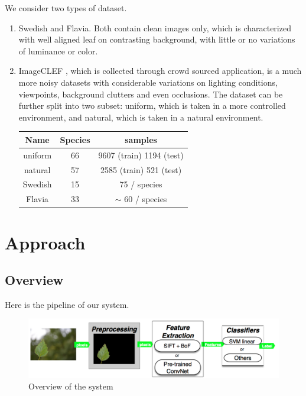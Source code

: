 \documentclass[journal, 10pt]{IEEEtran}
\begin{document}
    We consider two types of dataset.
\begin{enumerate}
  \item Swedish\cite{SwedishLeafDataset} and Flavia\cite{FlaviaDataset}. Both contain clean images only, which is characterized with well aligned leaf on contrasting background, with little or no variations of luminance or color. \\

  \item ImageCLEF \cite{ImageCLEF2013}, which is collected through crowd sourced application, is a much more noisy datasets with considerable variations on lighting conditions, viewpoints, background clutters and even occlusions. The dataset can be further split into two subset: uniform, which is taken in a more controlled environment, and natural, which is taken in a natural environment.
  \begin{center}
      \begin{tabular}{| c | c | c |}
      \hline
      Name    & Species & samples                  \\ \hline
      uniform & 66      & 9607 (train) 1194 (test) \\ \hline
      natural & 57      & 2585 (train) 521  (test) \\ \hline
      Swedish & 15      & 75 / species             \\ \hline
      Flavia  & 33      & $\sim$ 60 / species      \\ \hline
      \end{tabular}
  \end{center}
\end{enumerate}

\section{Approach}

\subsection{Overview}
Here is the pipeline of our system.
\begin{figure}[H]
  \center
  \includegraphics[width=1.0\linewidth]{overview}
  \caption{ Overview of the system }
  \label{fig:pipeline}
\end{figure}
\end{document}
